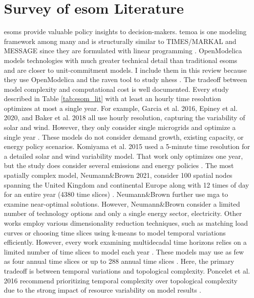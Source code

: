 \section{Survey of \gls{esom} Literature}

\glspl{esom} provide valuable policy insights to decision-makers. \gls{temoa}
is one modeling framework among many and is structurally similar to TIMES/MARKAL
and MESSAGE since they are formulated with linear programming \cite{yue_review_2018}.
OpenModelica models technologies with much greater technical detail than traditional
\glspl{esom} and are closer to unit-commitment models. I include them in this review
because they use OpenModelica and the \gls{raven} tool to study \glspl{nhes}
\cite{baker_optimal_2018,garcia_dynamic_2016,epiney_economic_2020}.
The tradeoff between model complexity and computational cost is well documented.
Every study described in Table \ref{tab:esom_lit} with at least an hourly
time resolution optimizes at most a single year. For example, Garcia et al. 2016,
Epiney et al. 2020, and Baker et al. 2018 all use hourly resolution, capturing
the variability of solar and wind. However, they only consider single microgrids
and optimize a single year
\cite{epiney_economic_2020,baker_optimal_2018,garcia_dynamic_2016}.
These models do not consider demand growth, existing capacity, or energy policy
scenarios. Komiyama et al. 2015 used a 5-minute time resolution for a detailed
solar and wind variability model. That work only optimizes one year, but
the study does consider several emissions and energy policies \cite{komiyama_energy_2015}.
The most spatially complex model, Neumann\&Brown 2021, consider 100 spatial nodes
spanning the United Kingdom and continental Europe along with 12 times of day for
an entire year (4380 time slices) \cite{neumann_near-optimal_2021}. Neumann\&Brown
further use \gls{mga} to examine near-optimal solutions. However, Neumann\&Brown consider
a limited number of technology options and only a single energy sector, electricity.
Other works employ various dimensionality reduction techniques, such as matching
load curves \cite{de_sisternes_value_2016,poncelet_impact_2016} or choosing time
slices using k-means \cite{kotzur_impact_2018} to model temporal variations efficiently.
However, every work examining multidecadal time horizons relies on a limited number
of time slices to model each year
\cite{alzbutas_uncertainty_2012,barron_differential_2015,bennett_extending_2021,
bouckaert_expanding_2014,decarolis_modelling_2016,li_open_2020,poncelet_impact_2016,
seck_embedding_2020,yue_least_2020}. These models may use as few as four annual
time slices \cite{decarolis_modelling_2016} or up to 288 annual time slices \cite{poncelet_impact_2016}.
Here, the primary tradeoff is between temporal variations and topological complexity.
Poncelet et al. 2016 recommend prioritizing temporal complexity over topological
complexity due to the strong impact of resource variability on model results \cite{poncelet_impact_2016}.

